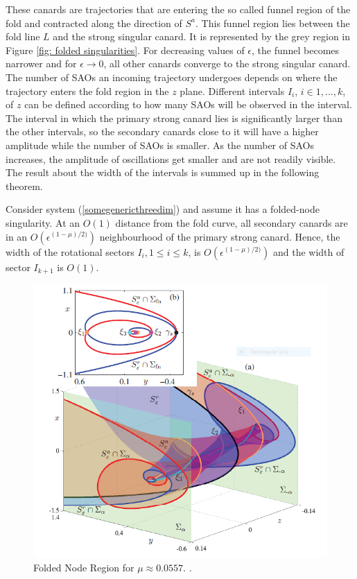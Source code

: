 These canards are trajectories that are entering the so called funnel region of the fold and contracted along the direction of $S^a$. This funnel region lies between the fold line $L$ and the strong singular canard. It is represented by the grey region in Figure \ref{fig: folded singularities}.
For decreasing values of $\epsilon$, the funnel becomes narrower and for $\epsilon \to 0$, all other canards converge to the strong singular canard.
The number of SAOs an incoming trajectory undergoes depends on where the trajectory enters the fold region in the $z$ plane. Different intervals $I_i$, $i \in 1,...,k$, of $z$ can be defined according to how many SAOs will be observed in the interval.
The interval in which the primary strong canard lies is significantly larger than the other intervals, so the secondary canards close to it will have a higher amplitude while the number of SAOs is smaller. As the number of SAOs increases, the amplitude of oscillations get smaller and are not readily visible.
The result about the width of the intervals is summed up in the following theorem.

\begin{theorem}
Consider system (\ref{somegenericthreedim}) and assume it has a folded-node singularity. At an $O(1)$ distance from the fold curve, all secondary canards are in an $O(\epsilon^{(1- \mu)/2)})$ neighbourhood of the primary strong canard. Hence, the width of the  rotational sectors $I_i, 1 \leq i \leq k$, is $O(\epsilon^{(1- \mu)/2)})$ and the width of sector $I_{k+1}$ is $O(1)$.
\end{theorem}


\begin{figure}[h!]\centering
	\includegraphics{Images/MMO1}
	\caption{Folded Node Region for $\mu \approx0.0557$. \citep{MMO}.}
	\label{fig: MMo1pic}
\end{figure}

